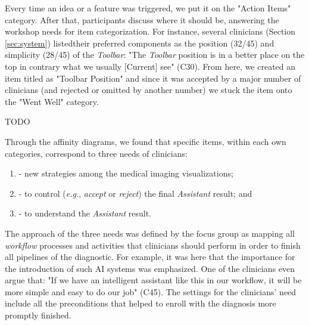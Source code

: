 Every time an idea or a feature was triggered, we put it on the "Action Items" category.
After that, participants discuss where it should be, answering the workshop needs for item categorization.
For instance, several clinicians (Section \ref{sec:system}) listed\footnotemark[17] their preferred components as the position (32/45) and simplicity (28/45) of the {\it Toolbar}:
"The {\it Toolbar} position is in a better place on the top in contrary what we usually [Current] see" (C30).
From here, we created an item titled as "Toolbar Position" and since it was accepted by a major number of clinicians (and rejected or omitted by another number) we stuck the item onto the "Went Well" category.


TODO

\hfill

\noindent
Through the affinity diagrams, we found that specific items, within each own categories, correspond to three needs of clinicians:

\hfill

\begin{enumerate}[label=\alph*]
\item - new strategies among the medical imaging visualizations;
\item - to control ({\it e.g.}, {\it accept} or {\it reject}) the final {\it Assistant} result; and
\item - to understand the {\it Assistant} result.
\end{enumerate}

\hfill

The approach of the three needs was defined by the focus group as mapping all {\it workflow} processes and activities that clinicians should perform in order to finish all pipelines of the diagnostic.
For example, it was here that the importance for the introduction of such AI systems was emphasized.
One of the clinicians even argue that: "If we have an intelligent assistant like this in our workflow, it will be more simple and easy to do our job" (C45).
The settings for the clinicians' need include all the preconditions that helped to enroll with the diagnosis more promptly finished.


